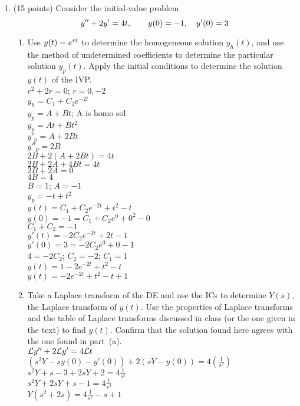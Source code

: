 \documentclass{article}
\begin{document}
\begin{enumerate}
\begin{enumerate}
\end{enumerate}


\bigskip
\item (15 points)  Consider the initial-value problem
\[
y\sp{\prime\prime}+2y\sp\prime=4t,\qquad y(0)=-1, \quad y\sp\prime(0)=3
\]
\begin{enumerate}
\item
Use $y(t)=e\sp{rt}$ to determine the homogeneous solution $y_h(t)$, and use the method of undetermined coefficients to determine the particular solution $y_p(t)$.  Apply the initial conditions to determine the solution $y(t)$ of the IVP.
\\$r^2+2r=0$; $r=0,-2$
\\$y_h=C_1+C_2e^{-2t}$
\\$y_p=A+Bt$; A is homo sol
\\$y_p=At+Bt^2$
\\$y'_p=A+2Bt$
\\$y''_p=2B$
\\$2B+2(A+2Bt)=4t$
\\$2B+2A+4Bt=4t$
\\$2B+2A=0$
\\$4B=4$
\\$B=1$; $A=-1$
\\$y_p=-t+t^2$
\\$y(t)=C_1+C_2e^{-2t}+t^2-t$
\\$y(0)=-1=C_1+C_2e^{0}+0^2-0$
\\$C_1+C_2=-1$
\\$y'(t)=-2C_2e^{-2t}+2t-1$
\\$y'(0)=3=-2C_2e^{0}+0-1$
\\$4=-2C_2$; $C_2=-2$; $C_1=1$
\\$y(t)=1-2e^{-2t}+t^2-t$
\\$y(t)=-2e^{-2t}+t^2-t+1$
\item
Take a Laplace transform of the DE and use the ICs to determine $Y(s)$, the Laplace transform of $y(t)$.  Use the properties of Laplace transforms and the table of Laplace transforms discussed in class (or the one given in the text) to find $y(t)$.  Confirm that the solution found here agrees with the one found in part~(a).
\\${\cal L}y''+2{\cal L}y'=4{\cal L}t$
\\$(s^2Y-sy(0)-y'(0))+2(sY-y(0))=4(\frac{1}{s^2})$
\\$s^2Y+s-3+2sY+2=4\frac{1}{s^2}$
\\$s^2Y+2sY+s-1=4\frac{1}{s^2}$
\\$Y(s^2+2s)=4\frac{1}{s^2}-s+1$

\end{enumerate}
\end{enumerate}
\end{document}
